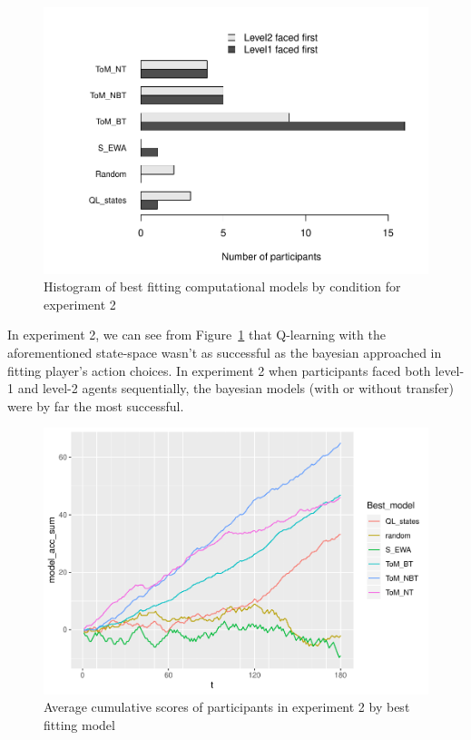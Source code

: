 \documentclass[man,floatsintext]{apa6}
\begin{document}
\begin{figure}

{\centering \includegraphics{draft_report_v1_files/figure-latex/exp2-comp-models-1} 

}

\caption{Histogram of best fitting computational models by condition for experiment 2}\label{fig:exp2-comp-models}
\end{figure}

In experiment 2, we can see from Figure~\ref{fig:exp2-comp-models} that Q-learning with the aforementioned state-space wasn't as successful as the bayesian approached in fitting player's action choices. In experiment 2 when participants faced both level-1 and level-2 agents sequentially, the bayesian models (with or without transfer) were by far the most successful.

\begin{figure}

{\centering \includegraphics{draft_report_v1_files/figure-latex/exp2-cumScores-1} 

}

\caption{Average cumulative scores of participants in experiment 2 by best fitting model}\label{fig:exp2-cumScores}
\end{figure}
\end{document}
